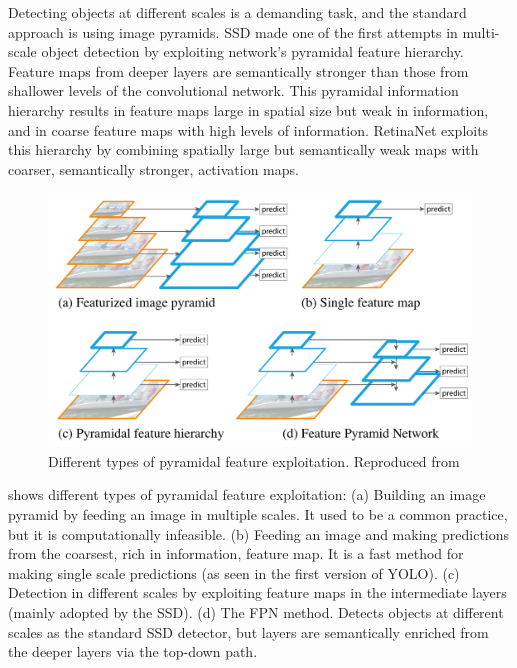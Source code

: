 Detecting objects at different scales is a demanding task, and the standard approach is using image pyramids. SSD made one of the first attempts in multi-scale object detection by exploiting network's pyramidal feature hierarchy. Feature maps from deeper layers are semantically stronger than those from shallower levels of the convolutional network. This pyramidal information hierarchy results in feature maps large in spatial size but weak in information, and in coarse feature maps with high levels of information. RetinaNet exploits this hierarchy by combining spatially large but semantically weak maps with coarser, semantically stronger, activation maps.

\begin{figure}[!htb]
  \centering
  \includegraphics[width=12cm]{figures/ch3/fig4.png}
  \caption{Different types of pyramidal feature exploitation. Reproduced from \cite{lin2017feature}}
  \label{ch3:fig4}
\end{figure} 

 shows different types of pyramidal feature exploitation: (a) Building an image pyramid by feeding an image in multiple scales. It used to be a common practice, but it is computationally infeasible. (b) Feeding an image and making predictions from the coarsest, rich in information, feature map. It is a fast method for making single scale predictions (as seen in the first version of YOLO). (c) Detection in different scales by exploiting feature maps in the intermediate layers (mainly adopted by the SSD). (d) The FPN method. Detects objects at different scales as the standard SSD detector, but layers are semantically enriched from the deeper layers via the top-down path.

